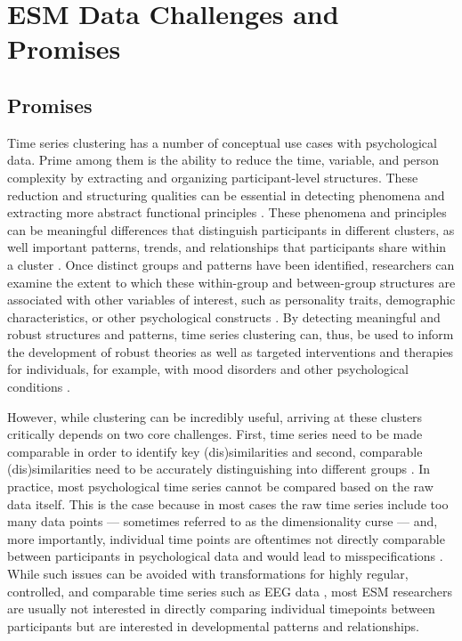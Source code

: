 \documentclass[man, 12pt, a4paper, mask, floatsintext]{apa7}
\theoremstyle{break}
\theoremstyle{plain}
\begin{document}
%




\printbibliography

\appendix

\section{ESM Data Challenges and Promises}
\label{app:ChallengesAppendix}

\subsection{Promises}

Time series clustering has a number of conceptual use cases with psychological data. Prime among them is the ability to reduce the time, variable, and person complexity by extracting and organizing participant-level structures. These reduction and structuring qualities can be essential in detecting phenomena and extracting more abstract functional principles \citep[][]{eronen2021a}. These phenomena and principles can be meaningful differences that distinguish participants in different clusters, as well important patterns, trends, and relationships that participants share within a cluster \citep[e.g.,][]{schrodt2000}. Once distinct groups and patterns have been identified, researchers can examine the extent to which these within-group and between-group structures are associated with other variables of interest, such as personality traits, demographic characteristics, or other psychological constructs \citep[e.g.,][]{monden2022}. By detecting meaningful and robust structures and patterns, time series clustering can, thus, be used to inform the development of robust theories as well as targeted interventions and therapies for individuals, for example, with mood disorders and other psychological conditions \citep[e.g.,][]{borsboom2021, eronen2020}.

However, while clustering can be incredibly useful, arriving at these clusters critically depends on two core challenges. First, time series need to be made comparable in order to identify key (dis)similarities and second, comparable (dis)similarities need to be accurately distinguishing into different groups \citep[e.g.,][]{Aghabozorgi2015}. In practice, most psychological time series cannot be compared based on the raw data itself. This is the case because in most cases the raw time series include too many data points --- sometimes referred to as the dimensionality curse \citep[e.g.,][]{altman2018} --- and, more importantly, individual time points are oftentimes not directly comparable between participants in psychological data and would lead to misspecifications \citep[e.g., ][]{faloutsos1994}. While such issues can be avoided with transformations for highly regular, controlled, and comparable time series such as EEG data \citep[e.g.,][]{huang1985}, most ESM researchers are usually not interested in directly comparing individual timepoints between participants but are interested in developmental patterns and relationships. 
\end{document}
